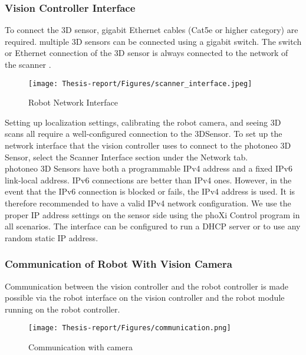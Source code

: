 \documentclass[12pt]{article}
\begin{document}
\subsubsection{Vision Controller Interface}
To connect the 3D sensor, gigabit Ethernet cables (Cat5e or higher category) are required.  multiple 3D sensors can be connected using a gigabit switch.  The switch or Ethernet connection of the 3D sensor is always connected to the network of the scanner \cite{ref2}.
\begin{figure}[h]
    \centering
    \texttt{[image: Thesis-report/Figures/scanner\_interface.jpeg]}
    \caption{Robot Network Interface \cite{ref2}}
    \label{fig:scanner-interface}
\end{figure}

 Setting up localization settings, calibrating the robot camera, and seeing 3D scans all require a well-configured connection to the 3DSensor. To set up the network interface that the vision controller uses to connect to the photoneo 3D Sensor, select the Scanner Interface section under the Network tab\cite{ref2}.\\

 photoneo 3D Sensors have both a programmable IPv4 address and a fixed IPv6 link-local address. IPv6 connections are better than IPv4 ones. However, in the event that the IPv6 connection is blocked or fails, the IPv4 address is used.  It is therefore recommended to have a valid IPv4 network configuration. We use the proper IP address settings on the sensor side using the phoXi Control program in all scenarios. The interface can be configured to run a DHCP server or to use any random static IP address\cite{ref2}.\\

\subsubsection{Communication of Robot With Vision Camera}
Communication between the vision controller and the robot controller is made possible via the robot interface on the vision controller and the robot module running on the robot controller\cite{ref2}.\\

\begin{figure}[h]
    \centering
    \texttt{[image: Thesis-report/Figures/communication.png]}
    \caption{Communication with camera \cite{ref2}}
    \label{fig:camera-comms}
\end{figure}
\end{document}
